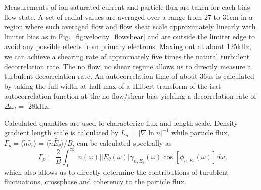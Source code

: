 \documentclass[%
 aps,
 prl,
 amsmath,amssymb,
 reprint,%
]{revtex4-1}
\begin{document}
Measurements of ion saturated current and particle flux are taken for each bias flow state. A set of radial values are averaged over a range from 27 to 31cm in a region where such averaged flow and flow shear scale approximately linearly with limiter bias as in 
Fig.~\ref{fig:velocity_flowshear}%
and are outside the limiter edge to avoid any possible effects from primary electrons. Maxing out at about 125kHz, we can achieve a shearing rate of approimately five times the natural turbulent decorrelation rate. The no flow, no shear regime allows us to directly measure a turbulent decorrelation rate. An autocorrelation time of about 36us is calculated by taking the full width at half max of a Hilbert transform of the isat autocorrelation function at the no flow/shear bias yielding a decorrelation rate of $\Delta \omega_{t} = $ 28kHz.

Calculated quantites are used to characterize flux and length scale. Density gradient length scale is calculated by $L_{n} = \lvert \nabla \ln n \rvert ^{-1}$ while particle flux, $\Gamma_{p} = \langle \tilde{n} \tilde{v_{r}} \rangle = \langle \tilde{n} \tilde{E_{\theta}} \rangle /B$, can be calculated spectrally as\cite{powers74}
\begin{equation}
\Gamma_{p} = \frac{2}{B} \int^{\infty}_{0} \lvert n(\omega) \rvert \lvert E_{\theta}(\omega) \rvert \gamma_{n,E_{\theta}}(\omega) \cos [\phi_{n,E_{\theta}}(\omega)] d\omega
\label{eq:fluxint}
\end{equation}
which also allows us to directly determine the contributions of turublent fluctuations, crossphase and coherency to the particle flux.


\end{document}
